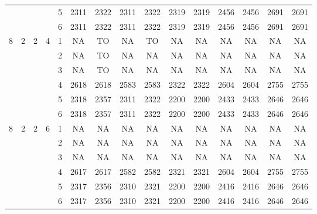 \begin{longtable}{|c|c|c|c|c|c c|c c|c c|c c|c c|}
 & & & & 5 & 2311 & 2322 & 2311 & 2322 & 2319 & 2319 & 2456 & 2456 & 2691 & 2691 \\
 & & & & 6 & 2311 & 2322 & 2311 & 2322 & 2319 & 2319 & 2456 & 2456 & 2691 & 2691 \\
\hline
\multirow{6}{*}{8} & \multirow{6}{*}{2} & \multirow{6}{*}{2} & \multirow{6}{*}{4} & 1 & NA & TO & NA & TO & NA & NA & NA & NA & NA & NA \\
 & & & & 2 & NA & TO & NA & NA & NA & NA & NA & NA & NA & NA \\
 & & & & 3 & NA & TO & NA & NA & NA & NA & NA & NA & NA & NA \\
 & & & & 4 & 2618 & 2618 & 2583 & 2583 & 2322 & 2322 & 2604 & 2604 & 2755 & 2755 \\
 & & & & 5 & 2318 & 2357 & 2311 & 2322 & 2200 & 2200 & 2433 & 2433 & 2646 & 2646 \\
 & & & & 6 & 2318 & 2357 & 2311 & 2322 & 2200 & 2200 & 2433 & 2433 & 2646 & 2646 \\
\hline
\multirow{6}{*}{8} & \multirow{6}{*}{2} & \multirow{6}{*}{2} & \multirow{6}{*}{6} & 1 & NA & NA & NA & NA & NA & NA & NA & NA & NA & NA \\
 & & & & 2 & NA & NA & NA & NA & NA & NA & NA & NA & NA & NA \\
 & & & & 3 & NA & NA & NA & NA & NA & NA & NA & NA & NA & NA \\
 & & & & 4 & 2617 & 2617 & 2582 & 2582 & 2321 & 2321 & 2604 & 2604 & 2755 & 2755 \\
 & & & & 5 & 2317 & 2356 & 2310 & 2321 & 2200 & 2200 & 2416 & 2416 & 2646 & 2646 \\
 & & & & 6 & 2317 & 2356 & 2310 & 2321 & 2200 & 2200 & 2416 & 2416 & 2646 & 2646 \\
\hline
\end{longtable}